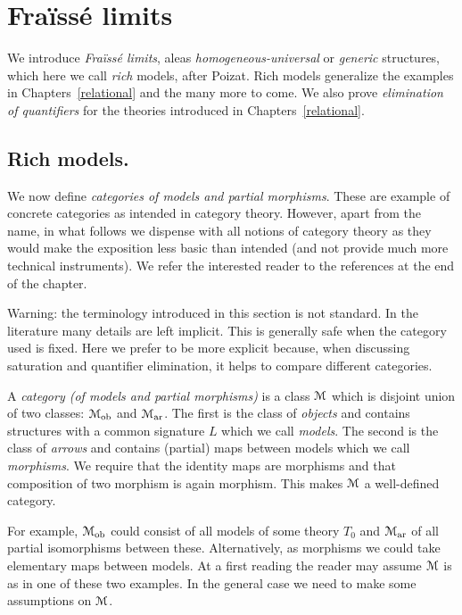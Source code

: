 \documentclass[creche.tex]{subfiles}
\begin{document}
\chapter{Fra\"issé limits}
\label{fraisse}

\def\ceq#1#2#3{\parbox[b]{20ex}{$\displaystyle #1$}\parbox[b]{4ex}{\hfil$#2$}$\displaystyle #3$}

We introduce \textit{Fra\"iss\'e limits}, aleas \textit{homogeneous-universal\/} or \textit{generic\/} structures, which here we call \textit{rich\/} models, after Poizat. Rich models generalize the examples in Chapters~\ref{relational} and the many more to come. We also prove \textit{elimination of quantifiers\/} for the theories introduced in Chapters~\ref{relational}.

\section{Rich models.}\label{rich}
We now define \textit{categories of models and partial morphisms}. These are example of concrete categories as intended in category theory. However, apart from the name, in what follows we dispense with all notions of category theory as they would make the exposition less basic than intended (and not provide much more technical instruments). We refer the interested reader to the references at the end of the chapter.

\noindent\llap{\textcolor{red}{\Large\danger}\kern1.5ex}Warning: the terminology introduced in this section is not standard. In the literature many details are left implicit. This is generally safe when the category used is fixed. Here we prefer to be more explicit because, when discussing saturation and quantifier elimination, it helps to compare different categories.

A \emph{category (of models and partial morphisms)\/} is a class $\EuScript M$ which is disjoint union of two classes: \emph{$\EuScript M_{\textrm{ob}}$} and \emph{$\EuScript M_{\textrm{ar}}$}. The first is the class of \emph{objects\/} and contains structures with a common signature $L$ which we call \emph{models}. The second is the class of \emph{arrows\/} and contains (partial) maps between models which we call \emph{morphisms}. We require that the identity maps are morphisms and that composition of two morphism is again morphism. This makes $\EuScript M$ a well-defined category. 

For example, $\EuScript M_{\rm ob}$ could consist of all models of some theory $T_0$ and $\EuScript M_{\rm ar}$ of all partial isomorphisms between these. Alternatively, as morphisms we could take elementary maps between models. At a first reading the reader may assume $\EuScript M$ is as in one of these two examples. In the general case we need to make some assumptions on $\EuScript M$.
\end{document}
